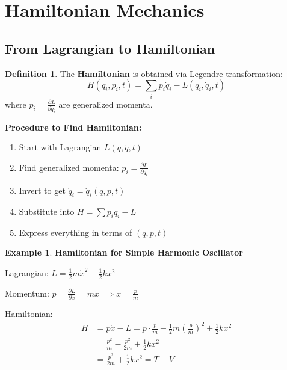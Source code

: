 \documentclass[12pt,a4paper]{article}
\theoremstyle{definition}
\newtheorem{definition}[theorem]{Definition}
\newtheorem{example}[theorem]{Example}
\begin{document}
\newpage
\section{Hamiltonian Mechanics}

\subsection{From Lagrangian to Hamiltonian}

\begin{definition}
The \textbf{Hamiltonian} is obtained via Legendre transformation:
\[
H(q_i, p_i, t) = \sum_i p_i\dot{q}_i - L(q_i, \dot{q}_i, t)
\]
where $p_i = \frac{\partial L}{\partial \dot{q}_i}$ are generalized momenta.
\end{definition}

\begin{importantbox}
\textbf{Procedure to Find Hamiltonian:}
\begin{enumerate}
    \item Start with Lagrangian $L(q, \dot{q}, t)$
    \item Find generalized momenta: $p_i = \frac{\partial L}{\partial \dot{q}_i}$
    \item Invert to get $\dot{q}_i = \dot{q}_i(q, p, t)$
    \item Substitute into $H = \sum p_i\dot{q}_i - L$
    \item Express everything in terms of $(q, p, t)$
\end{enumerate}
\end{importantbox}

\begin{example}
\textbf{Hamiltonian for Simple Harmonic Oscillator}

Lagrangian: $L = \frac{1}{2}m\dot{x}^2 - \frac{1}{2}kx^2$

Momentum: $p = \frac{\partial L}{\partial \dot{x}} = m\dot{x} \implies \dot{x} = \frac{p}{m}$

Hamiltonian:
\begin{align*}
H &= p\dot{x} - L = p \cdot \frac{p}{m} - \frac{1}{2}m\left(\frac{p}{m}\right)^2 + \frac{1}{2}kx^2 \\
&= \frac{p^2}{m} - \frac{p^2}{2m} + \frac{1}{2}kx^2 \\
&= \frac{p^2}{2m} + \frac{1}{2}kx^2 = T + V
\end{align*}
\end{example}
\end{document}
